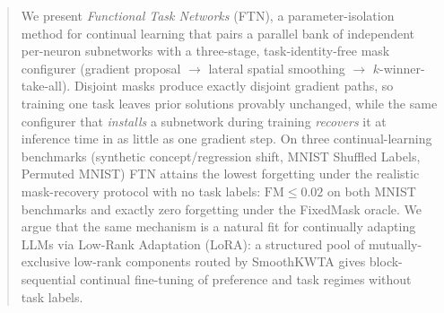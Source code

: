 \documentclass{article}
\theoremstyle{plain}
\theoremstyle{remark}
\begin{document}

\printAffiliationsAndNotice{}

\begin{abstract}
We present \emph{Functional Task Networks} (FTN), a parameter-isolation method for continual learning that pairs a parallel bank of independent per-neuron subnetworks with a three-stage, task-identity-free mask configurer (gradient proposal $\to$ lateral spatial smoothing $\to$ $k$-winner-take-all). Disjoint masks produce exactly disjoint gradient paths, so training one task leaves prior solutions provably unchanged, while the same configurer that \emph{installs} a subnetwork during training \emph{recovers} it at inference time in as little as one gradient step. On three continual-learning benchmarks (synthetic concept/regression shift, MNIST Shuffled Labels, Permuted MNIST) FTN attains the lowest forgetting under the realistic mask-recovery protocol with no task labels: $\mathrm{FM}\le 0.02$ on both MNIST benchmarks and exactly zero forgetting under the FixedMask oracle. We argue that the same mechanism is a natural fit for continually adapting LLMs via Low-Rank Adaptation (LoRA): a structured pool of mutually-exclusive low-rank components routed by SmoothKWTA gives block-sequential continual fine-tuning of preference and task regimes without task labels.
\end{abstract}

\end{document}
